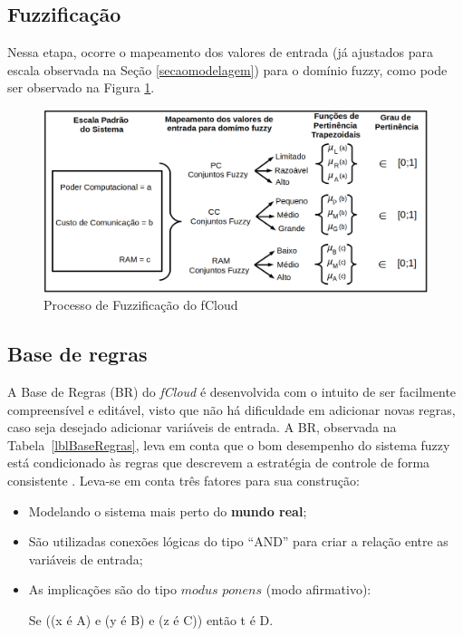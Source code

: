 \documentclass[tcc,capa]{texufpel}
\begin{document}
\newpage

\subsection{Fuzzificação}

Nessa etapa, ocorre o mapeamento dos valores de entrada (já ajustados para escala observada na Seção \ref{secaomodelagem}) para o domínio fuzzy, como pode ser observado na Figura \ref{fuzzificacaoModelagemPtBr}.

\begin{figure}[h]
   \centering
    \includegraphics[scale = 0.4]{images/fuzzificacaoModelagemPtBr.png} %
    \caption{Processo de Fuzzificação do fCloud}
    \label{fuzzificacaoModelagemPtBr}
\end{figure}

\subsection{Base de regras}\label{br}

A Base de Regras (BR) do \emph{fCloud} é desenvolvida com o intuito de ser facilmente compreensível e editável, visto que não há dificuldade em adicionar novas regras, caso seja desejado adicionar variáveis de entrada. A BR, observada na Tabela~\ref{lblBaseRegras}, leva em conta que o bom desempenho do sistema fuzzy está condicionado às regras que descrevem a estratégia de controle de forma consistente \cite{Klir2005}. Leva-se em conta três fatores para sua construção:

\begin{itemize}
	\item Modelando o sistema mais perto do \textbf{mundo real};
	\item São utilizadas conexões lógicas do tipo ``AND'' para criar a relação entre as variáveis de entrada;
	\item As implicações são do tipo $modus$ $ponens$ (modo afirmativo): \\ \begin{center}
	Se ((x é A) e (y é B) e (z é C)) então t é D.
	\end{center}
\end{itemize}
\end{document}
